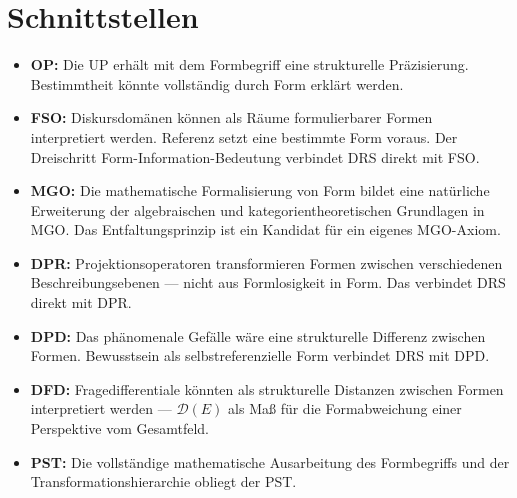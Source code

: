 \documentclass[11pt,a4paper]{article}
\theoremstyle{plain}
\theoremstyle{definition}
\begin{document}
\section{Schnittstellen}

\begin{itemize}
  \item \textbf{OP:} Die UP erh\"{a}lt mit dem Formbegriff eine strukturelle
        Pr\"{a}zisierung. Bestimmtheit k\"{o}nnte vollst\"{a}ndig durch Form erkl\"{a}rt
        werden.
  \item \textbf{FSO:} Diskursdom\"{a}nen k\"{o}nnen als R\"{a}ume formulierbarer Formen
        interpretiert werden. Referenz setzt eine bestimmte Form voraus. Der Dreischritt
        Form-Information-Bedeutung verbindet DRS direkt mit FSO.
  \item \textbf{MGO:} Die mathematische Formalisierung von Form bildet eine nat\"{u}rliche
        Erweiterung der algebraischen und kategorientheoretischen Grundlagen in MGO.
        Das Entfaltungsprinzip ist ein Kandidat f\"{u}r ein eigenes MGO-Axiom.
  \item \textbf{DPR:} Projektionsoperatoren transformieren Formen zwischen verschiedenen
        Beschreibungsebenen --- nicht aus Formlosigkeit in Form. Das verbindet DRS
        direkt mit DPR.
  \item \textbf{DPD:} Das ph\"{a}nomenale Gef\"{a}lle w\"{a}re eine strukturelle
        Differenz zwischen Formen. Bewusstsein als selbstreferenzielle Form verbindet
        DRS mit DPD.
  \item \textbf{DFD:} Fragedifferentiale k\"{o}nnten als strukturelle Distanzen
        zwischen Formen interpretiert werden --- $\mathcal{D}(E)$ als Ma\ss{} f\"{u}r
        die Formabweichung einer Perspektive vom Gesamtfeld.
  \item \textbf{PST:} Die vollst\"{a}ndige mathematische Ausarbeitung des Formbegriffs
        und der Transformationshierarchie obliegt der PST.
\end{itemize}
\end{document}
